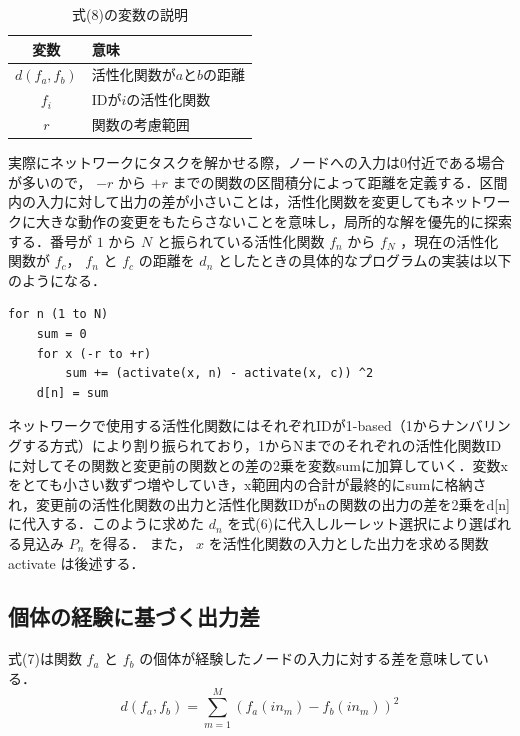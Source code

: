 \begin{table}[h]
    \caption{式(8)の変数の説明}
    \centering
    \begin{tabular}{cl}
        \hline
        変数  & 意味 \\
        \hline \hline
        $d(f_{a}, f_{b})$ & 活性化関数が$a$と$b$の距離                 \\
        $f_{i}$           & IDが$i$の活性化関数                        \\
        $r$               & 関数の考慮範囲                             \\
        \hline
    \end{tabular}
\end{table}

実際にネットワークにタスクを解かせる際，ノードへの入力は0付近である場合が多いので\cite{ノード入力}， $ -r $ から $ +r $ までの関数の区間積分によって距離を定義する．区間内の入力に対して出力の差が小さいことは，活性化関数を変更してもネットワークに大きな動作の変更をもたらさないことを意味し，局所的な解を優先的に探索する．番号が $ 1 $ から $ N $ と振られている活性化関数 $ f_n $ から $ f_N $ ，現在の活性化関数が $ f_c $， $ f_n $ と $ f_c $ の距離を $ d_n $ としたときの具体的なプログラムの実装は以下のようになる．

\begin{lstlisting}[caption=区間積分差のプログラム]
for n (1 to N)
    sum = 0
    for x (-r to +r)
        sum += (activate(x, n) - activate(x, c)) ^2
    d[n] = sum
\end{lstlisting}

ネットワークで使用する活性化関数にはそれぞれIDが1-based（1からナンバリングする方式）により割り振られており，1からNまでのそれぞれの活性化関数IDに対してその関数と変更前の関数との差の2乗を変数sumに加算していく．変数xをとても小さい数ずつ増やしていき，x範囲内の合計が最終的にsumに格納され，変更前の活性化関数の出力と活性化関数IDがnの関数の出力の差を2乗をd[n]に代入する．このように求めた $ d_n $ を式(6)に代入しルーレット選択により選ばれる見込み $ P_n $ を得る．
また， $ x $ を活性化関数の入力とした出力を求める関数 activate は後述する．

\subsection{個体の経験に基づく出力差}
式(7)は関数 $ f_a $ と $ f_b $ の個体が経験したノードの入力に対する差を意味している．
\begin{equation}
    d(f_{a}, f_{b}) = \sum_{m=1}^{M}(f_{a}(in_{m}) - f_{b}(in_{m}))^2
\end{equation}

